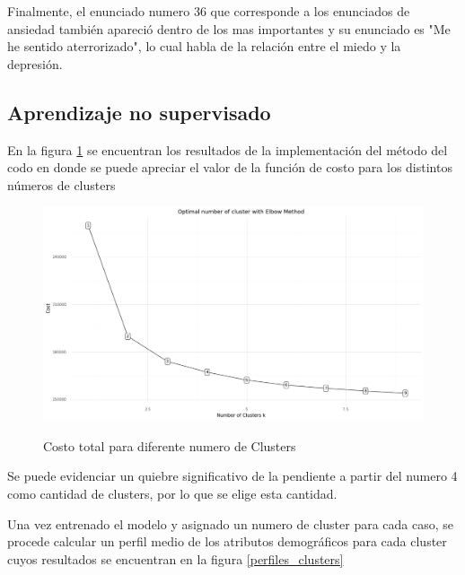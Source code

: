  \medbreak

Finalmente, el enunciado numero 36 que corresponde a los enunciados de ansiedad también apareció dentro de los mas importantes y su enunciado es "Me he sentido aterrorizado", lo cual habla de la relación entre el miedo y la depresión.

 \subsection{Aprendizaje no supervisado}
 
 En la figura \ref{elbow_analysis} se encuentran los resultados de la implementación del método del codo en donde se puede apreciar el valor de la función de costo para los distintos números de clusters

\begin{figure}[h]
\caption{Costo total para diferente numero de Clusters}
\centering
\includegraphics[width=\textwidth,height=\textheight,keepaspectratio]{Media/Pictures/elbow_analysis.png} 
\label{elbow_analysis}
\end{figure}

Se puede evidenciar un quiebre significativo de la pendiente a partir del numero 4 como cantidad de clusters, por lo que se elige esta cantidad.

\medbreak

Una vez entrenado el modelo y asignado un numero de cluster para cada caso, se procede calcular un perfil medio de los atributos demográficos para cada cluster cuyos resultados se encuentran en la figura \ref{perfiles_clusters}


